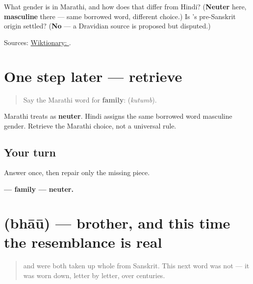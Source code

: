 \begin{tcolorbox}[breakable,colback=teal!4,colframe=teal!35!black,title={Before you move on}]
What gender is \textbf{} in Marathi, and how does that differ from Hindi? (\textbf{Neuter} here, \textbf{masculine} there — same borrowed word, different choice.) Is \textbf{}'s pre-Sanskrit origin settled? (\textbf{No} — a Dravidian source is proposed but disputed.)

Sources: \href{https://en.wiktionary.org/wiki/\%E0\%A4\%95\%E0\%A5\%81\%E0\%A4\%9F\%E0\%A5\%81\%E0\%A4\%82\%E0\%A4\%AC}{Wiktionary: }.
\end{tcolorbox}
\section[kutumb]{One step later — retrieve }

\label{lesson:MR-R11-kutumb-r1}



\begin{quote}
Say the Marathi word for \textbf{family}: \textbf{} (\emph{kutumb}).
\end{quote}

\begin{grammarlens}[title={What you've built}]
Marathi treats \textbf{} as \textbf{neuter}. Hindi assigns the same borrowed word masculine gender. Retrieve the Marathi choice, not a universal rule.
\end{grammarlens}

\subsection*{Your turn}
Answer once, then repair only the missing piece.

\begin{tcolorbox}[breakable,colback=teal!4,colframe=teal!35!black,title={Before you move on}]
\textbf{ — family — neuter.}
\end{tcolorbox}
\section[bhāū]{ (bhāū) — brother, and this time the resemblance is real}

\label{lesson:MR-C11-bhau}



\begin{quote}
\textbf{} and \textbf{} were both taken up whole from Sanskrit. This next word was not — it was worn down, letter by letter, over centuries.
\end{quote}

